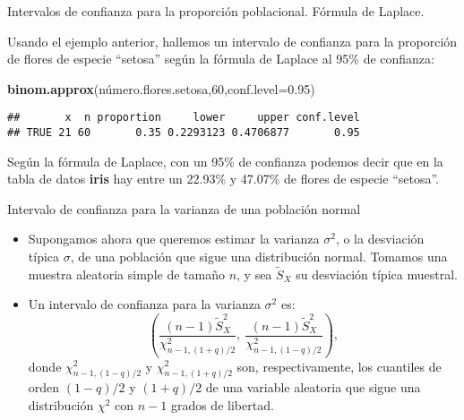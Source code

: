 \documentclass[ignorenonframetext,]{beamer}
\newenvironment{Shaded}{\begin{snugshade}}{\end{snugshade}}
\newcommand{\DataTypeTok}[1]{\textcolor[rgb]{0.13,0.29,0.53}{#1}}
\newcommand{\DecValTok}[1]{\textcolor[rgb]{0.00,0.00,0.81}{#1}}
\newcommand{\FloatTok}[1]{\textcolor[rgb]{0.00,0.00,0.81}{#1}}
\newcommand{\KeywordTok}[1]{\textcolor[rgb]{0.13,0.29,0.53}{\textbf{#1}}}
\newcommand{\NormalTok}[1]{#1}
\begin{document}
\begin{frame}[fragile]{Intervalos de confianza para la proporción
poblacional. Fórmula de Laplace.}
\protect\hypertarget{intervalos-de-confianza-para-la-proporcion-poblacional.-formula-de-laplace.-2}{}

Usando el ejemplo anterior, hallemos un intervalo de confianza para la
proporción de flores de especie ``setosa'' según la fórmula de Laplace
al 95\% de confianza:

\begin{Shaded}
\begin{Highlighting}[]
\KeywordTok{binom.approx}\NormalTok{(número.flores.setosa,}\DecValTok{60}\NormalTok{,}\DataTypeTok{conf.level=}\FloatTok{0.95}\NormalTok{)}
\end{Highlighting}
\end{Shaded}

\begin{verbatim}
##       x  n proportion     lower     upper conf.level
## TRUE 21 60       0.35 0.2293123 0.4706877       0.95
\end{verbatim}

Según la fórmula de Laplace, con un 95\% de confianza podemos decir que
en la tabla de datos \textbf{iris} hay entre un 22.93\% y 47.07\% de
flores de especie ``setosa''.

\end{frame}

\begin{frame}{Intervalo de confianza para la varianza de una población
normal}
\protect\hypertarget{intervalo-de-confianza-para-la-varianza-de-una-poblacion-normal}{}

\begin{itemize}
\item
  Supongamos ahora que queremos estimar la varianza \(\sigma^2\), o la
  desviación típica \(\sigma\), de una población que sigue una
  distribución normal. Tomamos una muestra aleatoria simple de tamaño
  \(n\), y sea \(\tilde{S}_X\) su desviación típica muestral.
\item
  Un intervalo de confianza para la varianza \(\sigma^2\) es: \[
  \left( \frac{(n-1)\widetilde{S}_{X}^2}{\chi_{n-1,(1+q)/2}^2},\
  \frac{(n-1)\widetilde{S}_{X}^2}{\chi_{n-1,(1-q)/2}^2}\right),
  \] donde \(\chi_{n-1,(1-q)/2}^2\) y \(\chi_{n-1,(1+q)/2}^2\) son,
  respectivamente, los cuantiles de orden \((1-q)/2\) y \((1+q)/2\) de
  una variable aleatoria que sigue una distribución \(\chi^2\) con
  \(n-1\) grados de libertad.
\end{itemize}

\end{frame}
\end{document}
